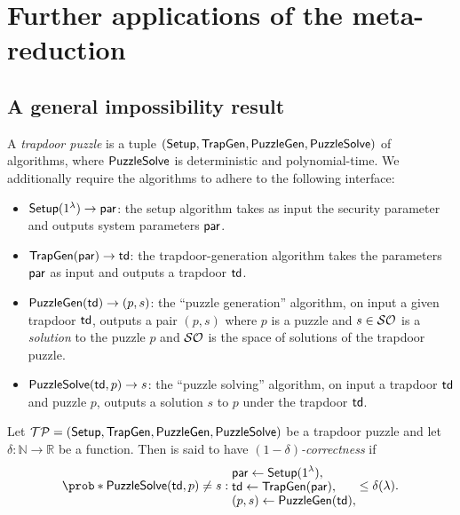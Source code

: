 
\section{Further applications of the meta-reduction}

\subsection{A general impossibility result}


\begin{definition}
  A \emph{trapdoor puzzle} is a tuple \((\mathsf{Setup},\allowbreak \mathsf{TrapGen},\allowbreak \mathsf{PuzzleGen},\allowbreak \mathsf{PuzzleSolve})\)
  of algorithms, where \(\mathsf{PuzzleSolve}\) is deterministic and polynomial-time.
  We additionally require the algorithms to adhere to the following interface:
  \begin{itemize}
    \item \(\mathsf{Setup}(1^{\lambda}) \to \mathsf{par}\): the setup algorithm takes
      as input the security parameter and outputs system parameters \(\mathsf{par}\).
    \item \(\mathsf{TrapGen}(\mathsf{par}) \to \mathsf{td}\): the trapdoor-generation algorithm
      takes the parameters \(\mathsf{par}\) as input and outputs a trapdoor \(\mathsf{td}\).
    \item \(\mathsf{PuzzleGen}(\mathsf{td}) \to (p,s)\): the ``puzzle generation'' algorithm,
      on input a given trapdoor \(\mathsf{td}\),
      outputs a pair \((p,s)\) where \(p\) is a puzzle and \(s \in \mathcal{SO}\)
      is a \emph{solution} to the puzzle \(p\) and \(\mathcal{SO}\) is the space of
      solutions of the trapdoor puzzle.
    \item \(\mathsf{PuzzleSolve}(\mathsf{td},p) \to s\): the ``puzzle solving'' algorithm,
      on input a trapdoor \(\mathsf{td}\) and puzzle \(p\),
      outputs a solution \(s\) to \(p\) under the trapdoor \(\mathsf{td}\).
  \end{itemize}

\end{definition}


\begin{definition}\label{def:corr}
  Let \(\mathcal{TP} = (\mathsf{Setup},\allowbreak \mathsf{TrapGen},\allowbreak \mathsf{PuzzleGen},
  \allowbreak \mathsf{PuzzleSolve})\) be a trapdoor puzzle
  and let \(\delta : \mathbb{N} \to \mathbb{R}\) be a function.
  Then \TP is said to have \emph{\((1-\delta)\)-correctness} if
  \begin{equation}
    \prob*{
      \PuzzleSolve(\td,p) \ne s
      : \begin{subarray}{l}
        \displaystyle \params \assign \Setup(1^{\lambda}),\\
        \displaystyle \td \assign \TrapGen(\params),\\
        \displaystyle (p,s) \assign \PuzzleGen(\td),
        \end{subarray}
    }
    \le \delta(\lambda).
  \end{equation}
\end{definition}

